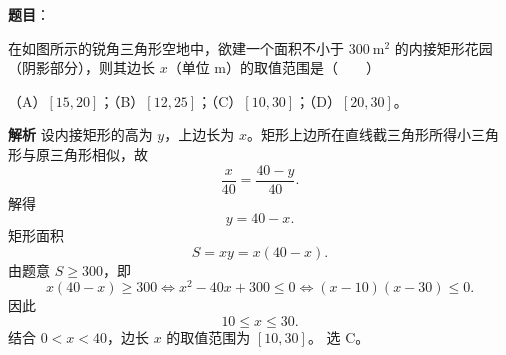 \begin{answer}

\textbf{题目}：

在如图所示的锐角三角形空地中，欲建一个面积不小于 $300\ \mathrm{m}^2$ 的内接矩形花园（阴影部分），则其边长 $x$（单位 m）的取值范围是\mbox{（　　）}
\nopagebreak[4]
\begin{center}\end{center}
\nopagebreak[4]
（A）$[15,20]$；（B）$[12,25]$；（C）$[10,30]$；（D）$[20,30]$。

\textbf{解析}
设内接矩形的高为 $y$，上边长为 $x$。矩形上边所在直线截三角形所得小三角形与原三角形相似，故
\nopagebreak[4]
\[\frac{x}{40}=\frac{40-y}{40}.\]
解得
\nopagebreak[4]
\[y=40-x.\]
矩形面积
\nopagebreak[4]
\[S=xy=x(40-x).\]
由题意 $S\geqslant300$，即
\nopagebreak[4]
\[x(40-x)\geqslant300
\Longleftrightarrow x^2-40x+300\leqslant0
\Longleftrightarrow (x-10)(x-30)\leqslant0.\]
因此
\nopagebreak[4]
\[10\leqslant x\leqslant30.\]
结合 $0<x<40$，边长 $x$ 的取值范围为 $[10,30]$。
选 C。


\end{answer}

